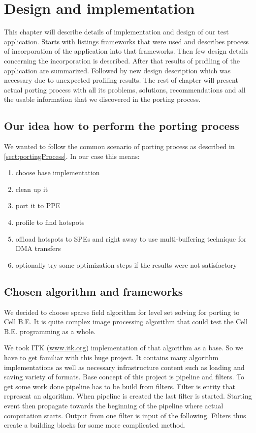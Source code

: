 \chapter{Design and implementation}

This chapter will describe details of implementation and design of our test application.
Starts with listings frameworks that were used and describes process of incorporation of the application into that frameworks.
Then few design details concerning the incorporation is described.
After that results of profiling of the application are summarized.
Followed by new design description which was necessary due to unexpected profiling results.
The rest of chapter will present actual porting process with all its problems, solutions, recommendations and all the usable information that we discovered in the porting process.

\section{Our idea how to perform the porting process}

We wanted to follow the common scenario of porting process as described in \ref{sect:portingProcess}.
In our case this means:
\begin{enumerate}
\item{choose base implementation}
\item{clean up it}
\item{port it to PPE}
\item{profile to find hotspots}
\item{offload hotspots to SPEs and right away to use multi-buffering technique for DMA transfers}
\item{optionally try some optimization steps if the results were not satisfactory}
\end{enumerate}

\section{Chosen algorithm and frameworks}

\par
We decided to choose sparse field algorithm for level set solving for porting to Cell B.E.
It is quite complex image processing algorithm that could test the Cell B.E. programming as a whole.

\par
We took ITK (\url{www.itk.org}) implementation of that algorithm as a base.
So we have to get familiar with this huge project.
It contains many algorithm implementations as well as necessary infrastructure content such as loading and saving variety of formats.
Base concept of this project is pipeline and filters.
To get some work done pipeline has to be build from filters.
Filter is entity that represent an algorithm.
When pipeline is created the last filter is started.
Starting event then propagate towards the beginning of the pipeline where actual computation starts.
Output from one filter is input of the following.
Filters thus create a building blocks for some more complicated method.

